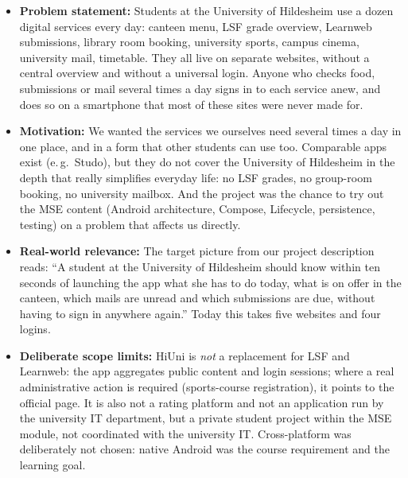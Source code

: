 \documentclass{msereport}
\begin{document}
\begin{itemize}
  \item \textbf{Problem statement:} Students at the University of Hildesheim
        use a dozen digital services every day: canteen menu,
        LSF grade overview, Learnweb submissions, library room booking,
        university sports, campus cinema, university mail, timetable. They all
        live on separate websites, without a central overview and without a
        universal login. Anyone who checks food, submissions or mail several
        times a day signs in to each service anew, and does so on a smartphone
        that most of these sites were never made for.
  \item \textbf{Motivation:} We wanted the services we ourselves need several
        times a day in one place, and in a form that other students can use too.
        Comparable apps exist (e.\,g.\ Studo), but they do not cover the
        University of Hildesheim in the depth that really simplifies everyday
        life: no LSF grades, no group-room booking, no university mailbox. And
        the project was the chance to try out the MSE content (Android
        architecture, Compose, Lifecycle, persistence, testing) on a problem
        that affects us directly.
  \item \textbf{Real-world relevance:} The target picture from our project
        description reads: ``A student at the University of Hildesheim should
        know within ten seconds of launching the app what she has to do today,
        what is on offer in the canteen, which mails are unread and which
        submissions are due, without having to sign in anywhere again.'' Today
        this takes five websites and four logins.
  \item \textbf{Deliberate scope limits:} HiUni is \emph{not} a replacement for
        LSF and Learnweb: the app aggregates public content and login sessions;
        where a real administrative action is required (sports-course
        registration), it points to the official page. It is also not a rating
        platform and not an application run by the university IT department, but
        a private student project within the MSE module, not coordinated with
        the university IT. Cross-platform was deliberately not chosen: native
        Android was the course requirement and the learning goal.
\end{itemize}

\msegap

\end{document}
